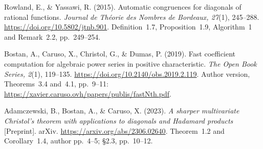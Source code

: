 Rowland, E., \& Yassawi, R. (2015).
Automatic congruences for diagonals of rational functions.
\emph{Journal de Th\'eorie des Nombres de Bordeaux, 27}(1), 245--288.
\url{https://doi.org/10.5802/jtnb.901}.
Definition~1.7, Proposition~1.9, Algorithm~1 and Remark~2.2,
pp.~249--254.

Bostan, A., Caruso, X., Christol, G., \& Dumas, P. (2019).
Fast coefficient computation for algebraic power series in positive
characteristic. \emph{The Open Book Series, 2}(1), 119--135.
\url{https://doi.org/10.2140/obs.2019.2.119}.
Author version, Theorems~3.4 and~4.1, pp.~9--11:
\url{https://xavier.caruso.ovh/papers/publis/fastNth.pdf}.

Adamczewski, B., Bostan, A., \& Caruso, X. (2023).
\emph{A sharper multivariate Christol's theorem with applications to
diagonals and Hadamard products} [Preprint]. arXiv.
\url{https://arxiv.org/abs/2306.02640}.
Theorem~1.2 and Corollary~1.4, author pp.~4--5; \S2.3, pp.~10--12.

